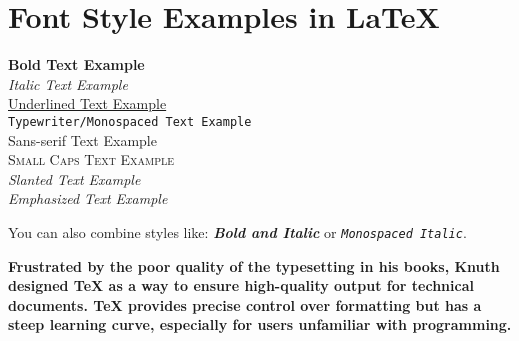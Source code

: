 \documentclass[12pt]{article}
\begin{document}
\section*{Font Style Examples in \LaTeX}

\textbf{Bold Text Example} \\
\textit{Italic Text Example} \\
\underline{Underlined Text Example} \\
\texttt{Typewriter/Monospaced Text Example} \\
\textsf{Sans-serif Text Example} \\
\textsc{Small Caps Text Example} \\
\textsl{Slanted Text Example} \\
\emph{Emphasized Text Example} \\

\bigskip

You can also combine styles like: \textbf{\textit{Bold and Italic}} or \texttt{\textit{Monospaced Italic}}.

{\bf Frustrated by the poor quality of the typesetting in his books, Knuth designed \TeX{} as a way to ensure high-quality output for technical documents. \TeX{} provides precise control over formatting but has a steep learning curve, especially for users unfamiliar with programming.}
\end{document}
